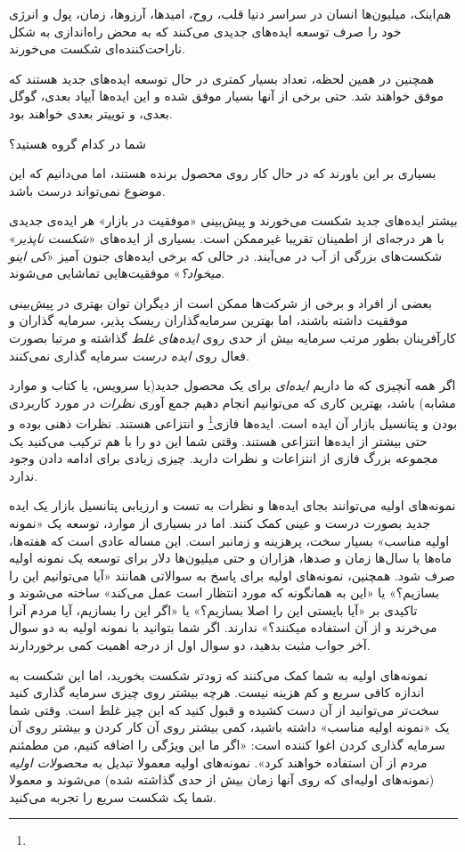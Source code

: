 هم‌اینک، میلیون‌ها انسان در سراسر دنیا قلب، روح، امیدها، آرزوها، زمان،
پول و انرژی خود را صرف توسعه ایده‌های جدیدی می‌کنند که به محض راه‌اندازی
به شکل ناراحت‌کننده‌ای شکست می‌خورند.

همچنین در همین لحظه، تعداد بسیار کمتری در حال توسعه ایده‌های جدید هستند
که موفق خواهند شد. حتی برخی از آنها بسیار موفق شده و این ایده‌ها آیپاد
بعدی، گوگل بعدی، و توییتر بعدی خواهند بود.

شما در کدام گروه هستید؟

بسیاری بر این باورند که در حال کار روی محصول برنده هستند، اما می‌دانیم
که این موضوع نمی‌تواند درست باشد.

بیشتر ایده‌های جدید شکست می‌خورند و پیش‌بینی «موفقیت در بازار» هر ایده‌ی
جدیدی با هر درجه‌ای از اطمینان تقریبا غیرممکن است. بسیاری از ایده‌های
«\emph{شکست ناپذیر}» شکست‌های بزرگی از آب در می‌آیند. در حالی که برخی
ایده‌های جنون آمیز «\emph{کی اینو میخواد؟}» موفقیت‌هایی تماشایی می‌شوند.

بعضی از افراد و برخی از شرکت‌ها ممکن است از دیگران توان بهتری در
پیش‌بینی موفقیت داشته باشند، اما بهترین سرمایه‌گذاران ریسک پذیر، سرمایه
گذاران و کارآفرینان بطور مرتب سرمایه بیش از حدی روی \emph{ایده‌های غلط}
گذاشته و مرتبا بصورت فعال روی \emph{ایده درست} سرمایه گذاری نمی‌کنند.

اگر همه آنچیزی که ما داریم \emph{ایده‌ای} برای یک محصول جدید(یا سرویس،
یا کتاب و موارد مشابه) باشد، بهترین کاری که می‌توانیم انجام دهیم جمع
آوری \emph{نظرات} در مورد کاربردی بودن و پتانسیل بازار آن ایده است.
ایده‌ها فازی\footnote{} و انتزاعی هستند. نظرات ذهنی بوده و حتی
بیشتر از ایده‌ها انتزاعی هستند. وقتی شما این دو را با هم ترکیب می‌کنید
یک مجموعه بزرگ فازی از انتزاعات و نظرات دارید. چیزی زیادی برای ادامه
دادن وجود ندارد.

نمونه‌های اولیه می‌توانند بجای ایده‌ها و نظرات به تست و ارزیابی پتانسیل
بازار یک ایده جدید بصورت درست و عینی کمک کنند. اما در بسیاری از موارد،
توسعه یک «نمونه اولیه مناسب» بسیار سخت، پرهزینه و زمانبر است. این مساله
عادی است که هفته‌ها، ماه‌ها یا سال‌ها زمان و صدها، هزاران و حتی
میلیون‌ها دلار برای توسعه یک نمونه اولیه صرف شود. همچنین، نمونه‌های
اولیه برای پاسخ به سوالاتی همانند «آیا می‌توانیم این را بسازیم؟» یا «این
به همانگونه که مورد انتظار است عمل می‌کند» ساخته می‌شوند و تاکیدی بر
«آیا بایستی این را اصلا بسازیم؟» یا «اگر این را بسازیم، آیا مردم آنرا
می‌خرند و از آن استفاده میکنند؟» ندارند. اگر شما بتوانید با نمونه اولیه
به دو سوال آخر جواب مثبت بدهید، دو سوال اول از درجه اهمیت کمی
برخوردارند.

نمونه‌های اولیه به شما کمک می‌کنند که زودتر شکست بخورید، اما این شکست به
اندازه کافی سریع و کم هزینه نیست. هرچه بیشتر روی چیزی سرمایه گذاری کنید
سخت‌تر می‌توانید از آن دست کشیده و قبول کنید که این چیز غلط است. وقتی
شما یک «نمونه اولیه مناسب» داشته باشید، کمی بیشتر روی آن کار کردن و
بیشتر روی آن سرمایه گذاری کردن اغوا کننده است: «اگر ما این ویژگی را
اضافه کنیم، من مطمئنم مردم از آن استفاده خواهند کرد». نمونه‌های اولیه
معمولا تبدیل به \emph{محصولات اولیه} (نمونه‌های اولیه‌ای که روی آنها
زمان بیش از حدی گذاشته شده) می‌شوند و معمولا شما یک شکست سریع را تجربه
می‌کنید.

